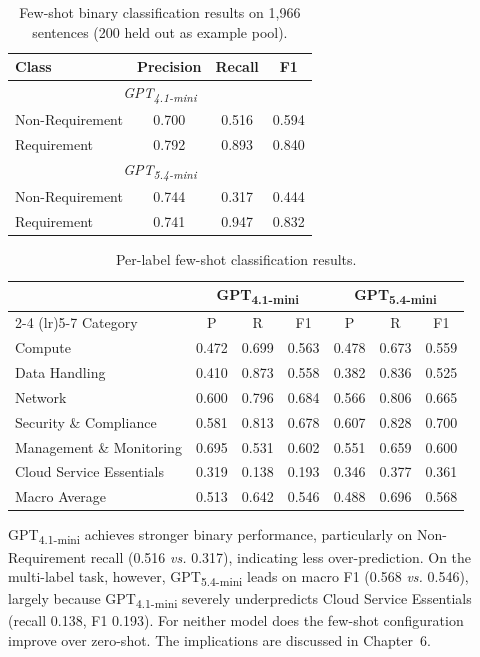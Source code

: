 \begin{table}[h]
\centering
\caption{Few-shot binary classification results on 1,966 sentences (200 held out as example pool).}
\label{tab:rq3_fewshot}
\begin{tabular}{lccc}
\toprule
Class & Precision & Recall & F1 \\
\midrule
\multicolumn{4}{c}{\textit{GPT\textsubscript{4.1-mini}}} \\
\midrule
Non-Requirement & 0.700 & 0.516 & 0.594 \\
Requirement     & 0.792 & 0.893 & 0.840 \\
\midrule
\multicolumn{4}{c}{\textit{GPT\textsubscript{5.4-mini}}} \\
\midrule
Non-Requirement & 0.744 & 0.317 & 0.444 \\
Requirement     & 0.741 & 0.947 & 0.832 \\
\bottomrule
\end{tabular}
\end{table}

\begin{table}[h]
\centering
\caption{Per-label few-shot classification results.}
\label{tab:rq3_fewshot_perlabel}
\footnotesize
\begin{tabular}{lcccccc}
\toprule
& \multicolumn{3}{c}{GPT\textsubscript{4.1-mini}} & \multicolumn{3}{c}{GPT\textsubscript{5.4-mini}} \\
\cmidrule(lr){2-4} \cmidrule(lr){5-7}
Category & P & R & F1 & P & R & F1 \\
\midrule
Compute                       & 0.472 & 0.699 & 0.563 & 0.478 & 0.673 & 0.559 \\
Data Handling                 & 0.410 & 0.873 & 0.558 & 0.382 & 0.836 & 0.525 \\
Network                       & 0.600 & 0.796 & 0.684 & 0.566 & 0.806 & 0.665 \\
Security \& Compliance         & 0.581 & 0.813 & 0.678 & 0.607 & 0.828 & 0.700 \\
Management \& Monitoring       & 0.695 & 0.531 & 0.602 & 0.551 & 0.659 & 0.600 \\
Cloud Service Essentials      & 0.319 & 0.138 & 0.193 & 0.346 & 0.377 & 0.361 \\
\midrule
Macro Average                 & 0.513 & 0.642 & 0.546 & 0.488 & 0.696 & 0.568 \\
\bottomrule
\end{tabular}
\end{table}

GPT\textsubscript{4.1-mini} achieves stronger binary performance, particularly on Non-Requirement recall (0.516 \textit{vs.} 0.317), indicating less over-prediction. On the multi-label task, however, GPT\textsubscript{5.4-mini} leads on macro F1 (0.568 \textit{vs.} 0.546), largely because GPT\textsubscript{4.1-mini} severely underpredicts Cloud Service Essentials (recall 0.138, F1 0.193). For neither model does the few-shot configuration improve over zero-shot. The implications are discussed in Chapter~6.


